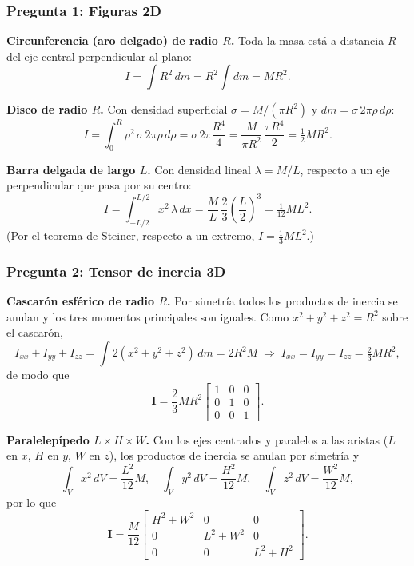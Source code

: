 \begin{sol}

\subsubsection*{Pregunta 1: Figuras 2D}

\textbf{Circunferencia (aro delgado) de radio $R$.} Toda la masa está a distancia $R$ del
eje central perpendicular al plano:
$$I = \int R^2\,dm = R^2\!\int dm = \boxed{MR^2}.$$

\textbf{Disco de radio $R$.} Con densidad superficial $\sigma=M/(\pi R^2)$ y $dm=\sigma\,2\pi\rho\,d\rho$:
$$I = \int_0^R \rho^2\,\sigma\,2\pi\rho\,d\rho = \sigma\,2\pi\frac{R^4}{4}
= \frac{M}{\pi R^2}\,\frac{\pi R^4}{2} = \boxed{\tfrac12 MR^2}.$$

\textbf{Barra delgada de largo $L$.} Con densidad lineal $\lambda=M/L$, respecto a un eje
perpendicular que pasa por su centro:
$$I = \int_{-L/2}^{L/2} x^2\,\lambda\,dx = \frac{M}{L}\,\frac{2}{3}\left(\frac{L}{2}\right)^3
= \boxed{\tfrac{1}{12}ML^2}.$$
(Por el teorema de Steiner, respecto a un extremo, $I=\tfrac13 ML^2$.)

\subsubsection*{Pregunta 2: Tensor de inercia 3D}

\textbf{Cascarón esférico de radio $R$.} Por simetría todos los productos de inercia se
anulan y los tres momentos principales son iguales. Como $x^2+y^2+z^2=R^2$ sobre el cascarón,
$$I_{xx}+I_{yy}+I_{zz} = \int 2(x^2+y^2+z^2)\,dm = 2R^2 M \;\Rightarrow\; I_{xx}=I_{yy}=I_{zz}=\tfrac23 MR^2,$$
de modo que
$$\mathbf{I} = \frac{2}{3}MR^2
\begin{bmatrix} 1 & 0 & 0 \\ 0 & 1 & 0 \\ 0 & 0 & 1 \end{bmatrix}.$$

\textbf{Paralelepípedo $L\times H\times W$.} Con los ejes centrados y paralelos a las aristas
($L$ en $x$, $H$ en $y$, $W$ en $z$), los productos de inercia se anulan por simetría y
$$\int_V x^2\,dV = \frac{L^2}{12}M,\quad \int_V y^2\,dV = \frac{H^2}{12}M,\quad \int_V z^2\,dV = \frac{W^2}{12}M,$$
por lo que
$$\mathbf{I} = \frac{M}{12}
\begin{bmatrix} H^2+W^2 & 0 & 0 \\ 0 & L^2+W^2 & 0 \\ 0 & 0 & L^2+H^2 \end{bmatrix}.$$

\end{sol}
